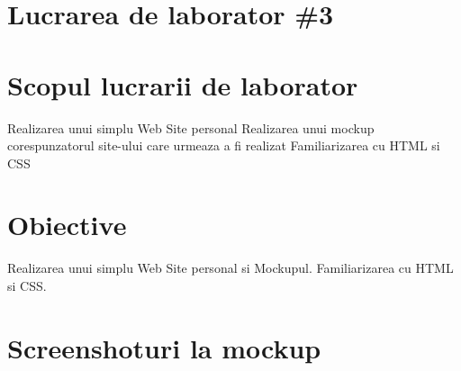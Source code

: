 \section*{Lucrarea de laborator \#3}

\section{Scopul lucrarii de laborator}
Realizarea unui simplu Web Site personal
Realizarea unui mockup corespunzatorul site-ului care urmeaza a fi realizat
Familiarizarea cu HTML si CSS
\section{Obiective}
Realizarea unui simplu Web Site personal si Mockupul.
Familiarizarea cu HTML si CSS.

\clearpage

\section{Screenshoturi la mockup}

